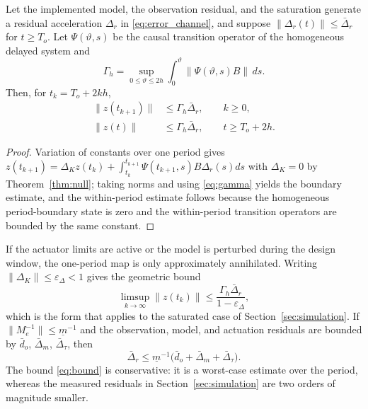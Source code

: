 \begin{theorem}\label{thm:practical}
Let the implemented model, the observation residual, and the saturation
generate a residual acceleration $\Delta_r$ in \eqref{eq:error_channel}, and
suppose $\|\Delta_r(t)\|\le\bar\Delta_r$ for $t\ge T_o$. Let
$\Psi(\vartheta,s)$ be the causal transition operator of the homogeneous
delayed system and
\begin{equation}
 \Gamma_h=\sup_{0\le\vartheta\le2h}\int_0^\vartheta\|\Psi(\vartheta,s)B\|\,ds .
 \label{eq:gamma}
\end{equation}
Then, for $t_k=T_o+2kh$,
\begin{equation}
\begin{aligned}
 \|z(t_{k+1})\|&\le\Gamma_h\bar\Delta_r,\qquad k\ge0,\\
 \|z(t)\|&\le\Gamma_h\bar\Delta_r,\qquad t\ge T_o+2h .
\end{aligned}
 \label{eq:bound}
\end{equation}
\end{theorem}

\begin{proof}
Variation of constants over one period gives
$z(t_{k+1})=\Delta_Kz(t_k)+\int_{t_k}^{t_{k+1}}\Psi(t_{k+1},s)B\Delta_r(s)ds$
with $\Delta_K=0$ by Theorem~\ref{thm:null}; taking norms and using
\eqref{eq:gamma} yields the boundary estimate, and the within-period estimate
follows because the homogeneous period-boundary state is zero and the
within-period transition operators are bounded by the same constant.
\end{proof}

If the actuator limits are active or the model is perturbed during the design
window, the one-period map is only approximately annihilated. Writing
$\|\Delta_K\|\le\varepsilon_\Delta<1$ gives the geometric bound
\begin{equation}
 \limsup_{k\to\infty}\|z(t_k)\|\le\frac{\Gamma_h\bar\Delta_r}
 {1-\varepsilon_\Delta},
 \label{eq:eps_bound}
\end{equation}
which is the form that applies to the saturated case of
Section~\ref{sec:simulation}. If $\|M_e^{-1}\|\le\underline m^{-1}$ and the
observation, model, and actuation residuals are bounded by $\bar d_o$,
$\bar\Delta_m$, $\bar\Delta_\tau$, then
\begin{equation}
 \bar\Delta_r\le\underline m^{-1}\bigl(\bar d_o+\bar\Delta_m+\bar\Delta_\tau\bigr).
 \label{eq:delta_r}
\end{equation}
The bound \eqref{eq:bound} is conservative: it is a worst-case estimate over
the period, whereas the measured residuals in Section~\ref{sec:simulation} are
two orders of magnitude smaller.
